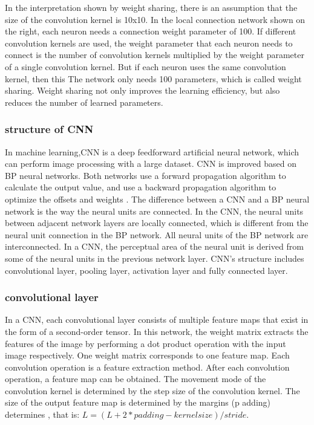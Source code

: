 In the interpretation shown by weight sharing, there is an assumption that the size of the convolution kernel is 10x10. In the local connection network shown on the right, each neuron needs a connection weight parameter of 100. If different convolution kernels are used, the weight parameter that each neuron needs to connect is the number of convolution kernels multiplied by the weight parameter of a single convolution kernel. But if each neuron uses the same convolution kernel, then this The network only needs 100 parameters, which is called weight sharing. Weight sharing not only improves the learning efficiency, but also reduces the number of learned parameters.


\subsubsection{structure of CNN}
In machine learning,CNN is a deep feedforward artificial neural network, which can perform image processing with a large dataset. 
CNN is improved based on BP neural networks.\cite{krizhevsky2012imagenet} Both networks use a forward propagation algorithm to calculate the output value, and use a backward propagation algorithm to optimize the offsets and weights . 
The difference between a CNN and a BP neural network is the way the neural units are connected. In the CNN, the neural units between adjacent network layers are locally connected, which is different from the neural unit connection in the BP network. All neural units of the BP network are interconnected. In a CNN, the perceptual area of the neural unit is derived from some of the neural units in the previous network layer. CNN's structure includes convolutional layer, pooling layer, activation layer and fully connected layer.\cite{abdel2012applying}

\subsubsection{convolutional layer}
In a CNN, each convolutional layer consists of multiple feature maps that exist in the form of a second-order tensor. In this network, the weight matrix extracts the features of the image by performing a dot product operation with the input image respectively. One weight matrix corresponds to one feature map. Each convolution operation is a feature extraction method. After each convolution operation, a feature map can be obtained. 
The movement mode of the convolution kernel is determined by the step size of the convolution kernel. The size of the output feature map is determined by the margins (p adding) determines , that is: $L = (L + 2 * padding-kernel size) / stride.$


